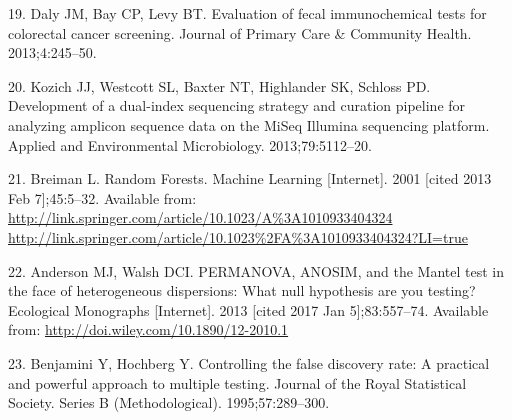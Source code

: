 \documentclass[12pt,]{article}
\begin{document}
\hypertarget{ref-daly_evaluation_2013}{}
19. Daly JM, Bay CP, Levy BT. Evaluation of fecal immunochemical tests
for colorectal cancer screening. Journal of Primary Care \& Community
Health. 2013;4:245--50.

\hypertarget{ref-kozich_development_2013}{}
20. Kozich JJ, Westcott SL, Baxter NT, Highlander SK, Schloss PD.
Development of a dual-index sequencing strategy and curation pipeline
for analyzing amplicon sequence data on the MiSeq Illumina sequencing
platform. Applied and Environmental Microbiology. 2013;79:5112--20.

\hypertarget{ref-breiman_random_2001}{}
21. Breiman L. Random Forests. Machine Learning {[}Internet{]}. 2001
{[}cited 2013 Feb 7{]};45:5--32. Available from:
\href{http://link.springer.com/article/10.1023/A\%3A1010933404324\%20http://link.springer.com/article/10.1023\%2FA\%3A1010933404324?LI=true}{http://link.springer.com/article/10.1023/A\%3A1010933404324 http://link.springer.com/article/10.1023\%2FA\%3A1010933404324?LI=true}

\hypertarget{ref-anderson_permanova_2013}{}
22. Anderson MJ, Walsh DCI. PERMANOVA, ANOSIM, and the Mantel test in
the face of heterogeneous dispersions: What null hypothesis are you
testing? Ecological Monographs {[}Internet{]}. 2013 {[}cited 2017 Jan
5{]};83:557--74. Available from:
\url{http://doi.wiley.com/10.1890/12-2010.1}

\hypertarget{ref-benjamini_controlling_1995}{}
23. Benjamini Y, Hochberg Y. Controlling the false discovery rate: A
practical and powerful approach to multiple testing. Journal of the
Royal Statistical Society. Series B (Methodological). 1995;57:289--300.
\end{document}

